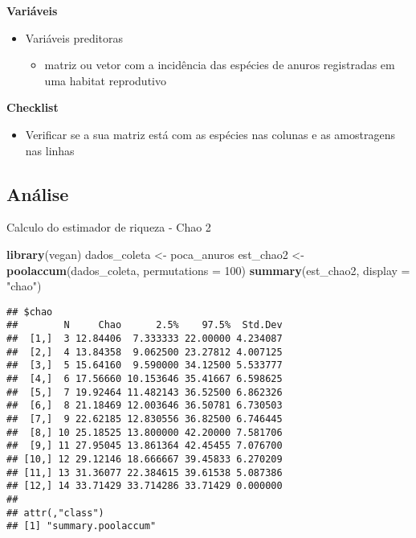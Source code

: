 \documentclass[
]{book}
\newenvironment{Shaded}{\begin{snugshade}}{\end{snugshade}}
\newcommand{\DataTypeTok}[1]{\textcolor[rgb]{0.13,0.29,0.53}{#1}}
\newcommand{\DecValTok}[1]{\textcolor[rgb]{0.00,0.00,0.81}{#1}}
\newcommand{\KeywordTok}[1]{\textcolor[rgb]{0.13,0.29,0.53}{\textbf{#1}}}
\newcommand{\NormalTok}[1]{#1}
\newcommand{\StringTok}[1]{\textcolor[rgb]{0.31,0.60,0.02}{#1}}
\providecommand{\tightlist}{%
  \setlength{\itemsep}{0pt}\setlength{\parskip}{0pt}}
\begin{document}
\textbf{Variáveis}

\begin{itemize}
\tightlist
\item
  Variáveis preditoras

  \begin{itemize}
  \tightlist
  \item
    matriz ou vetor com a incidência das espécies de anuros registradas em uma habitat reprodutivo
  \end{itemize}
\end{itemize}

\textbf{Checklist}

\begin{itemize}
\tightlist
\item
  Verificar se a sua matriz está com as espécies nas colunas e as amostragens nas linhas
\end{itemize}

\hypertarget{anuxe1lise-4}{%
\subsection{Análise}\label{anuxe1lise-4}}

Calculo do estimador de riqueza - Chao 2

\begin{Shaded}
\begin{Highlighting}[]
\KeywordTok{library}\NormalTok{(vegan)}
\NormalTok{dados_coleta <-}\StringTok{ }\NormalTok{poca_anuros}
\NormalTok{est_chao2 <-}\StringTok{ }\KeywordTok{poolaccum}\NormalTok{(dados_coleta, }\DataTypeTok{permutations =} \DecValTok{100}\NormalTok{)}
\KeywordTok{summary}\NormalTok{(est_chao2, }\DataTypeTok{display =} \StringTok{"chao"}\NormalTok{)}
\end{Highlighting}
\end{Shaded}

\begin{verbatim}
## $chao
##        N     Chao      2.5%    97.5%  Std.Dev
##  [1,]  3 12.84406  7.333333 22.00000 4.234087
##  [2,]  4 13.84358  9.062500 23.27812 4.007125
##  [3,]  5 15.64160  9.590000 34.12500 5.533777
##  [4,]  6 17.56660 10.153646 35.41667 6.598625
##  [5,]  7 19.92464 11.482143 36.52500 6.862326
##  [6,]  8 21.18469 12.003646 36.50781 6.730503
##  [7,]  9 22.62185 12.830556 36.82500 6.746445
##  [8,] 10 25.18525 13.800000 42.20000 7.581706
##  [9,] 11 27.95045 13.861364 42.45455 7.076700
## [10,] 12 29.12146 18.666667 39.45833 6.270209
## [11,] 13 31.36077 22.384615 39.61538 5.087386
## [12,] 14 33.71429 33.714286 33.71429 0.000000
## 
## attr(,"class")
## [1] "summary.poolaccum"
\end{verbatim}
\end{document}
